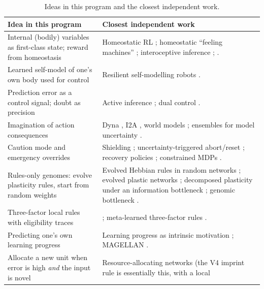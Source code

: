 \documentclass[11pt]{article}
\theoremstyle{remark}
\begin{document}
\begin{table}[t]
\centering\small
\caption{Ideas in this program and the closest independent work.}
\label{tab:convergent}
\begin{tabularx}{\linewidth}{>{\raggedright\arraybackslash}p{4.6cm}X}
\toprule
Idea in this program & Closest independent work \\
\midrule
Internal (bodily) variables as first-class state; reward from homeostasis &
Homeostatic RL \citep{keramati2014homeostatic}; homeostatic ``feeling machines'' \citep{man2019homeostasis};
interoceptive inference \citep{seth2013interoceptive}; \citet{ashby1952design}. \\
Learned self-model of one's own body used for control &
Resilient self-modelling robots \citep{bongard2006resilient,kwiatkowski2019task}. \\
Prediction error as a control signal; doubt as precision &
Active inference \citep{friston2010free,friston2017active}; dual control \citep{feldbaum1960dual,astrom2008adaptive}. \\
Imagination of action consequences &
Dyna \citep{sutton1991dyna}, I2A \citep{racaniere2017imagination}, world models
\citep{ha2018recurrent,hafner2020dream}; ensembles for model uncertainty \citep{chua2018deep,lakshminarayanan2017simple}. \\
Caution mode and emergency overrides &
Shielding \citep{alshiekh2018safe}; uncertainty-triggered abort/reset \citep{eysenbach2018leave}; recovery policies
\citep{thananjeyan2021recovery}; constrained MDPs \citep{altman1999constrained,achiam2017constrained}. \\
Rules-only genomes: evolve plasticity rules, start from random weights &
Evolved Hebbian rules in random networks \citep{najarro2020meta}; evolved plastic networks \citep{soltoggio2018born};
decomposed plasticity under an information bottleneck \citep{wang2021evolving}; genomic bottleneck
\citep{zador2019critique,shuvaev2024encoding}. \\
Three-factor local rules with eligibility traces &
\citet{gerstner2018eligibility}; meta-learned three-factor rules \citep{maoutsa2025meta}. \\
Predicting one's own learning progress &
Learning progress as intrinsic motivation \citep{schmidhuber1991curious,oudeyer2007intrinsic,graves2017automated};
MAGELLAN \citep{gaven2025magellan}. \\
Allocate a new unit when error is high \emph{and} the input is novel &
Resource-allocating networks \citep{platt1991resource} (the V4 imprint rule is essentially this, with a local

\end{tabularx}
\end{table}
\end{document}
